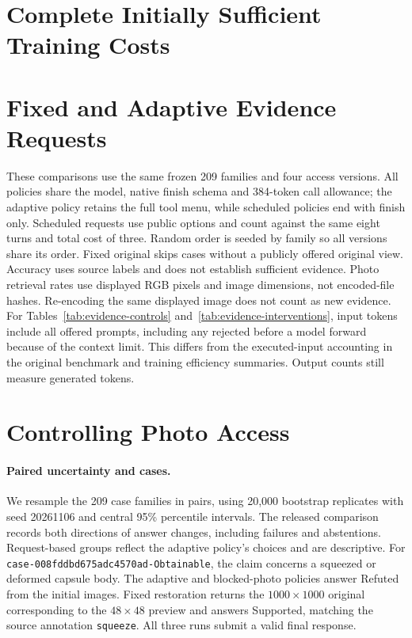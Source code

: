\section{Complete Initially Sufficient Training Costs}


\section{Fixed and Adaptive Evidence Requests}
These comparisons use the same frozen 209 families and four access versions. All policies share the model, native finish schema and 384-token call allowance; the adaptive policy retains the full tool menu, while scheduled policies end with finish only. Scheduled requests use public options and count against the same eight turns and total cost of three. Random order is seeded by family so all versions share its order. Fixed original skips cases without a publicly offered original view. Accuracy uses source labels and does not establish sufficient evidence.
Photo retrieval rates use displayed RGB pixels and image dimensions, not encoded-file hashes.
Re-encoding the same displayed image does not count as new evidence.
For Tables~\ref{tab:evidence-controls} and~\ref{tab:evidence-interventions}, input tokens include all offered prompts, including any rejected before a model forward because of the context limit.
This differs from the executed-input accounting in the original benchmark and training efficiency summaries.
Output counts still measure generated tokens.



\section{Controlling Photo Access}




\paragraph{Paired uncertainty and cases.}
We resample the 209 case families in pairs, using 20,000 bootstrap replicates with seed 20261106 and central 95\% percentile intervals.
The released comparison records both directions of answer changes, including failures and abstentions.
Request-based groups reflect the adaptive policy's choices and are descriptive.
For \texttt{case-008fddbd675adc4570ad-Obtainable}, the claim concerns a squeezed or deformed capsule body.
The adaptive and blocked-photo policies answer Refuted from the initial images.
Fixed restoration returns the $1000\!\times\!1000$ original corresponding to the $48\!\times\!48$ preview and answers Supported, matching the source annotation \texttt{squeeze}.
All three runs submit a valid final response.


